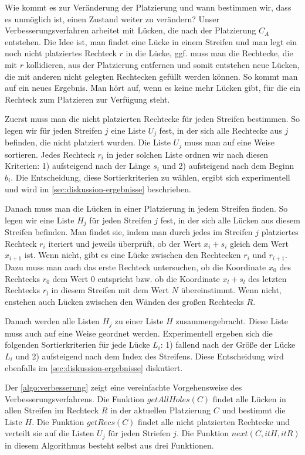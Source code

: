 Wie kommt es zur Veränderung der Platzierung und wann bestimmen wir,
dass es unmöglich ist, einen Zustand weiter zu verändern?
Unser Verbesserungsverfahren arbeitet mit Lücken, die 
nach der Platzierung $C_A$ entstehen.
Die Idee ist, man findet eine Lücke in einem Streifen 
und man legt ein noch nicht platziertes Rechteck $r$ in die Lücke,
ggf. muss man die Rechtecke,
die mit $r$ kollidieren, aus der Platzierung entfernen
und somit entstehen neue Lücken,
die mit anderen nicht gelegten Rechtecken gefüllt werden können.
So kommt man auf ein neues Ergebnis.
Man hört auf, wenn es keine mehr Lücken gibt, für die ein Rechteck zum Platzieren zur Verfügung steht.


Zuerst muss man die nicht platzierten Rechtecke für jeden Streifen bestimmen. 
So legen wir für jeden Streifen $j$ eine Liste $U_j$ fest, in der sich alle 
Rechtecke aus $j$ befinden, die nicht platziert wurden.
Die Liste $U_j$ muss man auf eine Weise sortieren.
Jedes Rechteck $r_i$ in jeder solchen Liste ordnen wir nach diesen Kriterien:
1) aufsteigend nach der Länge $s_i$ und 2) aufsteigend nach dem Beginn $b_i$.
Die Entscheidung, diese Sortierkriterien zu wählen, ergibt sich experimentell 
und wird im \cref{sec:diskussion-ergebnisse} beschrieben.


Danach muss man die Lücken in einer Platzierung in jedem Streifen finden.
So legen wir eine Liste $H_j$ für jeden Streifen $j$ fest, in der sich alle
Lücken aus diesem Streifen befinden. Man findet sie, indem
man durch jedes im Streifen $j$ platziertes Rechteck $r_i$ iteriert und jeweils überprüft,
ob der Wert $x_i + s_i$ gleich dem Wert $x_{i+1}$ ist. Wenn nicht, gibt es eine Lücke
zwischen den Rechtecken $r_i$ und $r_{i+1}$.
Dazu muss man auch das erste Rechteck untersuchen, ob die Koordinate $x_0$ des Rechtecks $r_0$
dem Wert 0 entspricht bzw. ob die Koordinate $x_l + s_l$ des letzten Rechtecks $r_l$ in diesem Streifen
mit dem Wert $N$ übereinstimmt.
Wenn nicht, enstehen auch Lücken zwischen den Wänden des großen Rechtecks $R$.  

Danach werden alle Listen $H_j$ zu einer Liste $H$ zusammengebracht.
Diese Liste muss auch auf eine Weise geordnet werden. 
Experimentell ergeben sich die folgenden Sortierkriterien für jede Lücke $L_i$: 
1) fallend nach der Größe der Lücke $L_i$ und 2) aufsteigend nach dem
Index des Streifens. Diese Entscheidung wird ebenfalls im \cref{sec:diskussion-ergebnisse}
diskutiert.



Der \cref{algo:verbesserung} zeigt eine vereinfachte Vorgehensweise des Verbesserungsverfahrens.
Die Funktion $getAllHoles(C)$ findet alle Lücken in allen Streifen im Rechteck $R$ in der
aktuellen Platzierung $C$ und bestimmt die Liste $H$.
Die Funktion $getRecs(C)$ findet alle nicht platzierten Rechtecke und verteilt sie auf
die Listen $U_j$ für jeden Striefen $j$.
Die Funktion $next(C, itH, itR)$ in diesem Algorithmus besteht selbst aus drei Funktionen.

